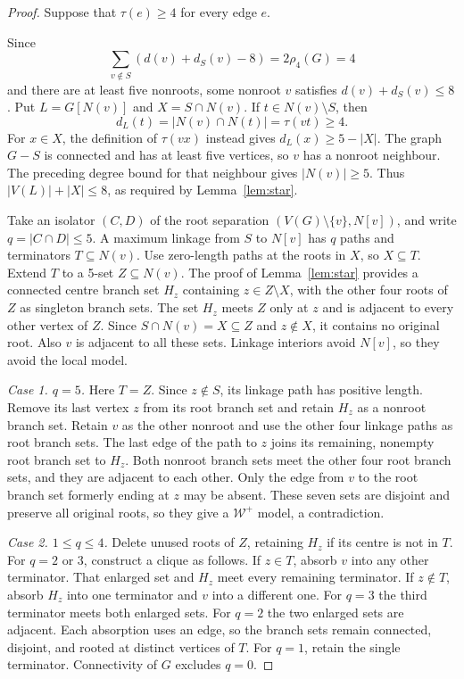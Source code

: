 \documentclass[11pt]{article}
\theoremstyle{remark}
\numberwithin{equation}{section}
\newcommand{\W}{\mathcal W}
\begin{document}
\begin{proof}
Suppose that $\tau(e)\ge4$ for every edge $e$.

Since
\[
\sum_{v\notin S}(d(v)+d_S(v)-8)=2\rho_4(G)=4
\]
and there are at least five nonroots, some nonroot $v$ satisfies $d(v)+d_S(v)\le8$. Put $L=G[N(v)]$ and $X=S\cap N(v)$. If $t\in N(v)\setminus S$, then
\[
d_L(t)=|N(v)\cap N(t)|=\tau(vt)\ge4.
\]
For $x\in X$, the definition of $\tau(vx)$ instead gives $d_L(x)\ge5-|X|$. The graph $G-S$ is connected and has at least five vertices, so $v$ has a nonroot neighbour. The preceding degree bound for that neighbour gives $|N(v)|\ge5$. Thus $|V(L)|+|X|\le8$, as required by Lemma~\ref{lem:star}.

Take an isolator $(C,D)$ of the root separation $(V(G)\setminus\{v\},N[v])$, and write $q=|C\cap D|\le5$. A maximum linkage from $S$ to $N[v]$ has $q$ paths and terminators $T\subseteq N(v)$. Use zero-length paths at the roots in $X$, so $X\subseteq T$. Extend $T$ to a 5-set $Z\subseteq N(v)$. The proof of Lemma~\ref{lem:star} provides a connected centre branch set $H_z$ containing $z\in Z\setminus X$, with the other four roots of $Z$ as singleton branch sets. The set $H_z$ meets $Z$ only at $z$ and is adjacent to every other vertex of $Z$. Since $S\cap N(v)=X\subseteq Z$ and $z\notin X$, it contains no original root. Also $v$ is adjacent to all these sets. Linkage interiors avoid $N[v]$, so they avoid the local model.

\smallskip\noindent\emph{Case 1. $q=5$.}
Here $T=Z$. Since $z\notin S$, its linkage path has positive length. Remove its last vertex $z$ from its root branch set and retain $H_z$ as a nonroot branch set. Retain $v$ as the other nonroot and use the other four linkage paths as root branch sets. The last edge of the path to $z$ joins its remaining, nonempty root branch set to $H_z$. Both nonroot branch sets meet the other four root branch sets, and they are adjacent to each other. Only the edge from $v$ to the root branch set formerly ending at $z$ may be absent. These seven sets are disjoint and preserve all original roots, so they give a $\W^+$ model, a contradiction.

\smallskip\noindent\emph{Case 2. $1\le q\le4$.}
Delete unused roots of $Z$, retaining $H_z$ if its centre is not in $T$. For $q=2$ or $3$, construct a clique as follows. If $z\in T$, absorb $v$ into any other terminator. That enlarged set and $H_z$ meet every remaining terminator. If $z\notin T$, absorb $H_z$ into one terminator and $v$ into a different one. For $q=3$ the third terminator meets both enlarged sets. For $q=2$ the two enlarged sets are adjacent. Each absorption uses an edge, so the branch sets remain connected, disjoint, and rooted at distinct vertices of $T$. For $q=1$, retain the single terminator. Connectivity of $G$ excludes $q=0$.


\end{proof}
\end{document}
